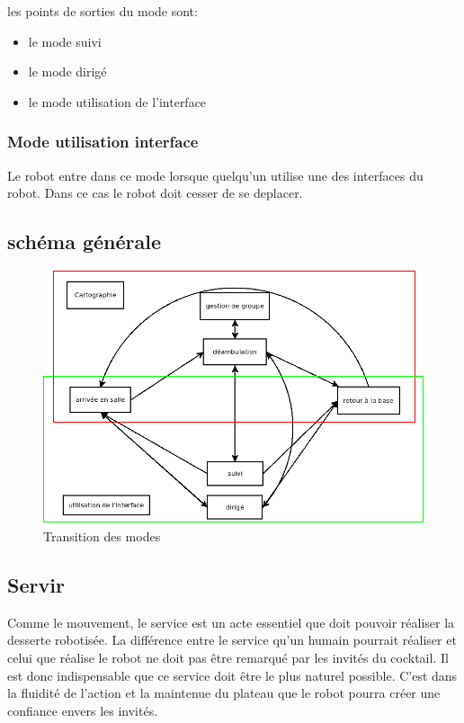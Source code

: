 les points de sorties du mode sont:
\begin{itemize}
\item le mode suivi
\item le mode dirigé
\item le mode utilisation de l'interface\\
\end{itemize}

\subsubsection{Mode utilisation interface}
Le robot entre dans ce mode lorsque quelqu'un utilise une des
interfaces du robot. Dans ce cas le robot doit cesser de se deplacer.

\subsection{schéma générale}

\begin{figure}[h]
\begin{center}
\includegraphics[scale=0.55]{Images/transition_mode.png}
\caption{Transition des modes}
\label{Transition des modes}
\end{center}
\end{figure}

\subsection{Servir}

Comme le mouvement, le service est un acte essentiel que doit pouvoir
réaliser la desserte robotisée.  La différence entre le service qu’un
humain pourrait réaliser et celui que réalise le robot ne doit pas
être remarqué par les invités du cocktail. Il est donc indispensable
que ce service doit être le plus naturel possible. C’est dans la
fluidité de l’action et la maintenue du plateau que le robot pourra
créer une confiance envers les invités.

